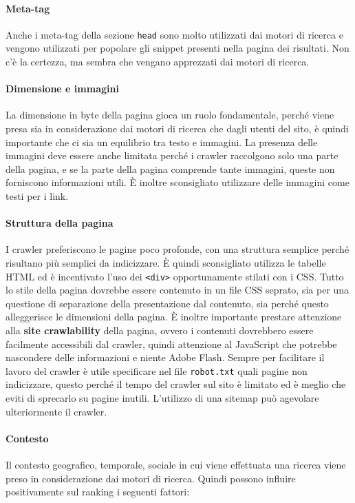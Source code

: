 \paragraph{Meta-tag}Anche i meta-tag della sezione \texttt{head} sono molto utilizzati dai motori di ricerca e vengono utilizzati per popolare gli snippet presenti nella pagina dei risultati.
Non c'è la certezza, ma sembra che vengano apprezzati dai motori di ricerca.

\paragraph{Dimensione e immagini} La dimensione in byte della pagina gioca un ruolo fondamentale, perché viene presa sia in considerazione dai motori di ricerca che dagli utenti del sito, è quindi importante che ci sia un equilibrio tra testo e immagini.
La presenza delle immagini deve essere anche limitata perché i crawler raccolgono solo una parte della pagina, e se la parte della pagina comprende tante immagini, queste non forniscono informazioni utili.
\`E inoltre sconsigliato utilizzare delle immagini come testi per i link.

\paragraph{Struttura della pagina} I crawler preferiscono le pagine poco profonde, con una struttura semplice perché risultano più semplici da indicizzare. \`E quindi sconsigliato utilizza le tabelle HTML ed è incentivato l'uso dei \texttt{<div>} opportunamente stilati con i CSS.
Tutto lo stile della pagina dovrebbe essere contenuto in un file CSS seprato, sia per una questione di separazione della presentazione dal contenuto, sia perché questo alleggerisce le dimensioni della pagina.
\`E inoltre importante prestare attenzione alla \textbf{site crawlability} della pagina, ovvero i contenuti dovrebbero essere facilmente accessibili dal crawler, quindi attenzione al JavaScript che potrebbe nascondere delle informazioni e niente Adobe Flash.
Sempre per facilitare il lavoro del crawler è utile specificare nel file \texttt{robot.txt} quali pagine non indicizzare, questo perché il tempo del crawler sul sito è limitato ed è meglio che eviti di sprecarlo su pagine inutili. L'utilizzo di una sitemap può agevolare ulteriormente il crawler.

\paragraph{Contesto} Il contesto geografico, temporale, sociale in cui viene effettuata una ricerca viene preso in considerazione dai motori di ricerca. Quindi possono influire positivamente sul ranking i seguenti fattori:


